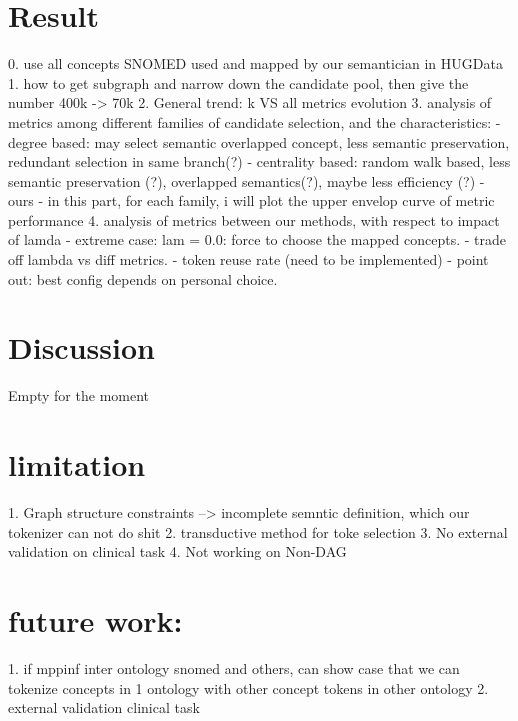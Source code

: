 \documentclass{article}
\begin{document}
\section{Result}
0. use all concepts SNOMED used and mapped by our semantician in HUGData
1. how to get subgraph and narrow down the candidate pool, then give the number 400k -> 70k
2. General trend: k VS all metrics evolution
3. analysis of metrics among different families of candidate selection, and the characteristics:
- degree based: may select semantic overlapped concept, less semantic preservation, redundant selection in same branch(?)
- centrality based: random walk based, less semantic preservation (?), overlapped semantics(?), maybe less efficiency (?)
- ours
- in this part, for each family, i will plot the upper envelop curve of metric performance
4. analysis of metrics between our methods, with respect to impact of lamda
- extreme case: lam = 0.0: force to choose the mapped concepts.
- trade off lambda vs diff metrics.
- token reuse rate (need to be implemented)
- point out: best config depends on personal choice.

\section{Discussion}
Empty for the moment
\section{limitation}
1. Graph structure constraints --> incomplete semntic definition, which our tokenizer can not do shit
2. transductive method for toke selection
3. No external validation on clinical task
4. Not working on Non-DAG
\section{future work:}
1. if mppinf inter ontology snomed and others, can show case that we can tokenize concepts in 1 ontology with other concept tokens in other ontology
2. external validation clinical task

\fi








\end{document}
